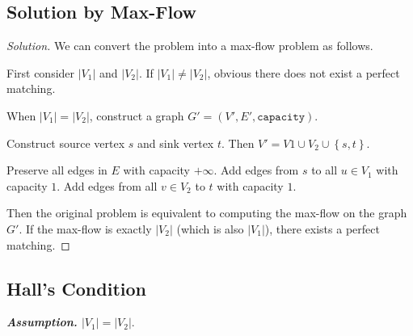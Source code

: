 \documentclass{article}
\newcommand{\set}[1]{\left\{#1\right\}}
\newenvironment{solution}{\begin{proof}[\noindent\it Solution]}{\end{proof}}
\begin{document}
\subsection{Solution by Max-Flow}
\vspace{1em}
\begin{solution}
    We can convert the problem into a max-flow problem as follows.
    
    \hspace{2.6em}
    First consider $|V_1|$ and $|V_2|$. If $|V_1|\neq|V_2|$, obvious there does not exist a perfect matching.
    
    \hspace{2.6em}
    When $|V_1|=|V_2|$, construct a graph $G'=(V',E',\mathtt{capacity})$. 
    
    \hspace{2.6em}
    Construct source vertex $s$ and sink vertex $t$. Then $V'=V1\cup V_2\cup\set{s,t}.$
    
    \hspace{2.6em}
    Preserve all edges in $E$ with capacity $+\infty$. Add edges from $s$ to all $u\in V_1$ with capacity $1$. Add edges from all $v\in V_2$ to $t$ with capacity $1$.
    
    \hspace{2.6em}
    Then the original problem is equivalent to computing the max-flow on the graph $G'$. If the max-flow is exactly $|V_2|$ (which is also $|V_1|$), there exists a perfect matching.
\end{solution}

\vspace{.5em}

\subsection{Hall's Condition}
\vspace{.5em}
\textit{\textbf{Assumption.} $|V_1|=|V_2|.$}
\end{document}

